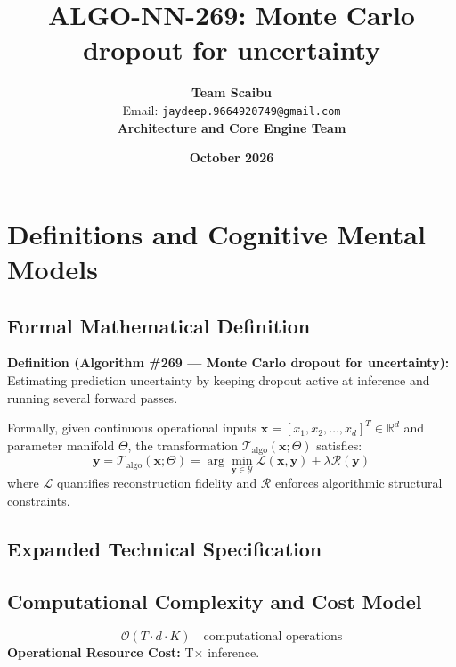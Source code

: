 \documentclass[11pt,a4paper]{article}
\title{\textbf{ALGO-NN-269: Monte Carlo dropout for uncertainty}}
\author{\textbf{Team Scaibu} \\ \small Email: \texttt{jaydeep.9664920749@gmail.com} \\ \small \textbf{Architecture and Core Engine Team}}
\date{\textbf{October 2026}}
\theoremstyle{definition}
\begin{document}
\maketitle

\section{Definitions and Cognitive Mental Models}

\subsection{Formal Mathematical Definition}
\textbf{Definition (Algorithm \#269 --- Monte Carlo dropout for uncertainty):}
Estimating prediction uncertainty by keeping dropout active at inference and running several forward passes.

Formally, given continuous operational inputs $\mathbf{x} = [x_1, x_2, \dots, x_d]^T \in \mathbb{R}^d$ and parameter manifold $\Theta$, the transformation $\mathcal{T}_{\text{algo}}(\mathbf{x}; \Theta)$ satisfies:
{\boldmath
\begin{equation}
\mathbf{y} = \mathcal{T}_{\text{algo}}(\mathbf{x}; \Theta) = \arg\min_{\mathbf{y} \in \mathcal{Y}} \mathcal{L}(\mathbf{x}, \mathbf{y}) + \lambda \mathcal{R}(\mathbf{y})
\end{equation}
}
where $\mathcal{L}$ quantifies reconstruction fidelity and $\mathcal{R}$ enforces algorithmic structural constraints.

\subsection{Expanded Technical Specification}

\subsection{Computational Complexity and Cost Model}
\begin{equation}
\mathcal{O}(T \cdot d \cdot K) \quad \text{computational operations}
\end{equation}
\textbf{Operational Resource Cost:} T× inference.
\end{document}

